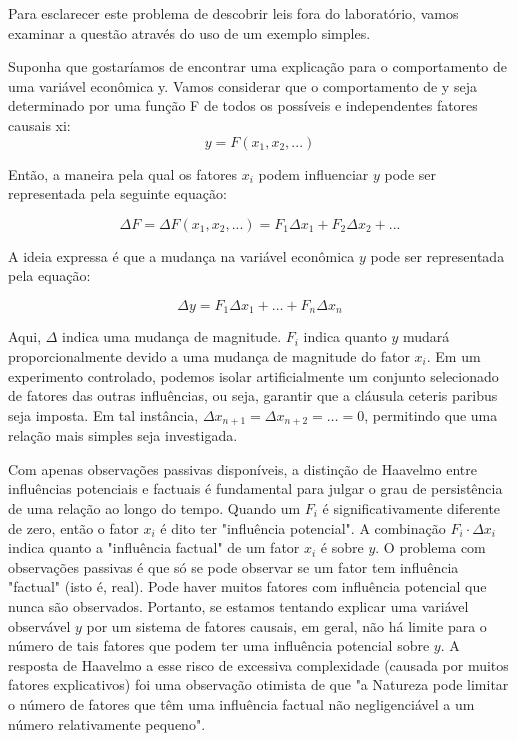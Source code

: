 \documentclass[12pt]{article}
\begin{document}
Para esclarecer este problema de descobrir leis fora do laboratório, vamos examinar a questão através do uso de um exemplo simples.

Suponha que gostaríamos de encontrar uma explicação para o comportamento de uma variável econômica y. Vamos considerar que o comportamento de y seja determinado por uma função F de todos os possíveis e independentes fatores causais xi:
$$
y = F(x_{1}, x_{2}, ...)
$$

Então, a maneira pela qual os fatores \( x_i \) podem influenciar \( y \) pode ser representada pela seguinte equação:

$$
{\Delta}F = {\Delta}F(x_{1}, x_{2}, ...) = F_1{\Delta}x_1 + F_2{\Delta}x_2 + ...
$$

A ideia expressa é que a mudança na variável econômica \( y \) pode ser representada pela equação:

$$ \Delta y = F_1 \Delta x_1 + \ldots + F_n \Delta x_n $$

Aqui, \( \Delta \) indica uma mudança de magnitude. \( F_i \) indica quanto \( y \) mudará proporcionalmente devido a uma mudança de magnitude do fator \( x_i \). Em um experimento controlado, podemos isolar artificialmente um conjunto selecionado de fatores das outras influências, ou seja, garantir que a cláusula ceteris paribus seja imposta. Em tal instância, \( \Delta x_{n+1} = \Delta x_{n+2} = \ldots = 0 \), permitindo que uma relação mais simples seja investigada.

Com apenas observações passivas disponíveis, a distinção de Haavelmo entre influências potenciais e factuais é fundamental para julgar o grau de persistência de uma relação ao longo do tempo. Quando um \( F_i \) é significativamente diferente de zero, então o fator \( x_i \) é dito ter "influência potencial". A combinação \( F_i \cdot \Delta x_i \) indica quanto a "influência factual" de um fator \( x_i \) é sobre \( y \). O problema com observações passivas é que só se pode observar se um fator tem influência "factual" (isto é, real). Pode haver muitos fatores com influência potencial que nunca são observados. Portanto, se estamos tentando explicar uma variável observável \( y \) por um sistema de fatores causais, em geral, não há limite para o número de tais fatores que podem ter uma influência potencial sobre \( y \). A resposta de Haavelmo a esse risco de excessiva complexidade (causada por muitos fatores explicativos) foi uma observação otimista de que "a Natureza pode limitar o número de fatores que têm uma influência factual não negligenciável a um número relativamente pequeno".
\end{document}

